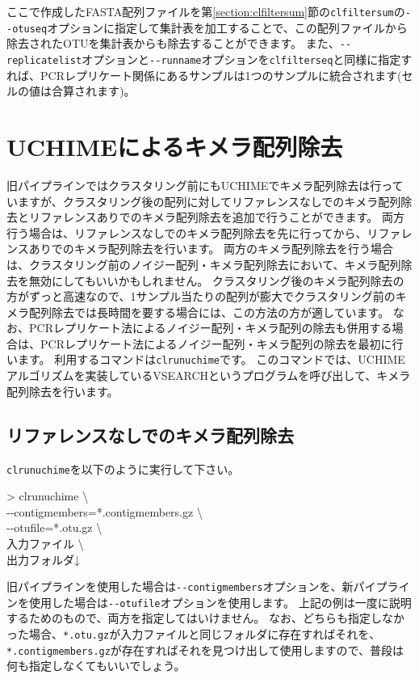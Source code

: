 \documentclass[titlepage,10pt,a4paper]{jsbook}
\newenvironment{cmd}{\begin{oframed}\raggedright\ttfamily\footnotesize\setlength{\baselineskip}{1.4em}}{\end{oframed}\vspace{-1em}}
\begin{document}
ここで作成したFASTA配列ファイルを第\ref{section:clfiltersum}節の\texttt{clfiltersum}の\texttt{{-}{-}otuseq}オプションに指定して集計表を加工することで、この配列ファイルから除去されたOTUを集計表からも除去することができます。
また、\texttt{{-}{-}replicatelist}オプションと\texttt{{-}{-}runname}オプションを\texttt{clfilterseq}と同様に指定すれば、PCRレプリケート関係にあるサンプルは1つのサンプルに統合されます(セルの値は合算されます)。

\section{UCHIMEによるキメラ配列除去}

旧パイプラインではクラスタリング前にもUCHIMEでキメラ配列除去は行っていますが、クラスタリング後の配列に対してリファレンスなしでのキメラ配列除去とリファレンスありでのキメラ配列除去を追加で行うことができます。
両方行う場合は、リファレンスなしでのキメラ配列除去を先に行ってから、リファレンスありでのキメラ配列除去を行います。
両方のキメラ配列除去を行う場合は、クラスタリング前のノイジー配列・キメラ配列除去において、キメラ配列除去を無効にしてもいいかもしれません。
クラスタリング後のキメラ配列除去の方がずっと高速なので、1サンプル当たりの配列が膨大でクラスタリング前のキメラ配列除去では長時間を要する場合には、この方法の方が適しています。
なお、PCRレプリケート法によるノイジー配列・キメラ配列の除去も併用する場合は、PCRレプリケート法によるノイジー配列・キメラ配列の除去を最初に行います。
利用するコマンドは\texttt{clrunuchime}です。
このコマンドでは、UCHIMEアルゴリズムを実装しているVSEARCHというプログラムを呼び出して、キメラ配列除去を行います。

\subsection{リファレンスなしでのキメラ配列除去}

\texttt{clrunuchime}を以下のように実行して下さい。
\begin{cmd}
{\textgreater} clrunuchime {\textbackslash}\\
{-}{-}contigmembers=*.contigmembers.gz {\textbackslash}\\
{-}{-}otufile=*.otu.gz {\textbackslash}\\
入力ファイル {\textbackslash}\\
出力フォルダ↓
\end{cmd}
旧パイプラインを使用した場合は\texttt{{-}{-}contigmembers}オプションを、新パイプラインを使用した場合は\texttt{{-}{-}otufile}オプションを使用します。
上記の例は一度に説明するためのもので、両方を指定してはいけません。
なお、どちらも指定しなかった場合、\texttt{*.otu.gz}が入力ファイルと同じフォルダに存在すればそれを、\texttt{*.contigmembers.gz}が存在すればそれを見つけ出して使用しますので、普段は何も指定しなくてもいいでしょう。
\end{document}

